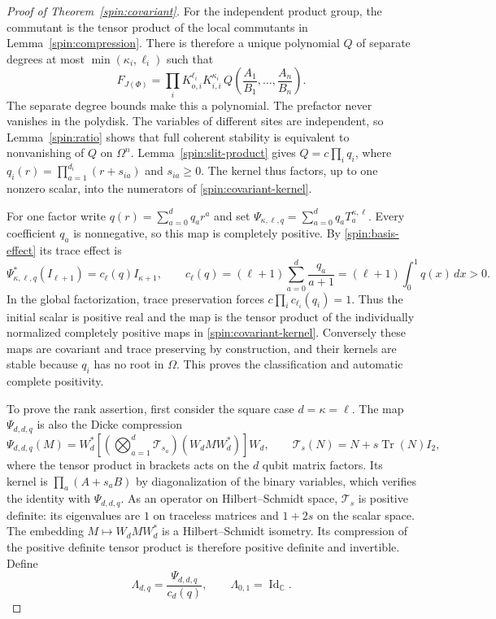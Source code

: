 \documentclass[reqno]{amsart}
\theoremstyle{definition}
\theoremstyle{remark}
\newcommand{\C}{\mathbb C}
\DeclareMathOperator{\Tr}{Tr}
\DeclareMathOperator{\Id}{Id}
\begin{document}
\begin{proof}[Proof of Theorem~\ref{spin:covariant}]
For the independent product group, the commutant is the tensor product
of the local commutants in Lemma~\ref{spin:compression}.  There is
therefore a unique polynomial $Q$ of separate degrees at most
$\min(\kappa_i,\ell_i)$ such that
\begin{equation}\label{spin:global-invariant}
 F_{J(\Phi)}=
 \prod_iK_{o,i}^{\ell_i}K_{i,i}^{\kappa_i}\,
 Q\left(\frac{A_1}{B_1},\ldots,\frac{A_n}{B_n}\right).
\end{equation}
The separate degree bounds make this a polynomial.  The prefactor
never vanishes in the polydisk.  The variables of different sites are
independent, so Lemma~\ref{spin:ratio} shows that full coherent stability
is equivalent to nonvanishing of $Q$ on $\Omega^n$.
Lemma~\ref{spin:slit-product} gives
$Q=c\prod_iq_i$, where
$q_i(r)=\prod_{a=1}^{d_i}(r+s_{ia})$ and $s_{ia}\geq0$.
The kernel thus factors, up to one nonzero scalar, into the numerators
of \eqref{spin:covariant-kernel}.

For one factor write $q(r)=\sum_{a=0}^dq_ar^a$ and set
$\Psi_{\kappa,\ell,q}=\sum_{a=0}^dq_aT_a^{\kappa,\ell}$.
Every coefficient $q_a$ is nonnegative, so this map is completely
positive.  By \eqref{spin:basis-effect} its trace effect is
\begin{equation}\label{spin:normalization}
 \Psi_{\kappa,\ell,q}^*(I_{\ell+1})
 =c_\ell(q)I_{\kappa+1},\qquad
 c_\ell(q)=(\ell+1)\sum_{a=0}^d\frac{q_a}{a+1}
          =(\ell+1)\int_0^1q(x)\,dx>0.
\end{equation}
In the global factorization, trace preservation forces
$c\prod_ic_{\ell_i}(q_i)=1$.  Thus the initial scalar is positive
real and the map is the tensor product of the individually normalized
completely positive maps in \eqref{spin:covariant-kernel}.
Conversely these maps are covariant and trace preserving by construction,
and their kernels are stable because $q_i$ has no root in $\Omega$.
This proves the classification and automatic complete positivity.

To prove the rank assertion, first consider the square case $d=\kappa
=\ell$.  The map $\Psi_{d,d,q}$ is also the Dicke compression
\begin{equation}\label{spin:core-compression}
 \Psi_{d,d,q}(M)=W_d^*\left[
     \left(\bigotimes_{a=1}^d\mathcal T_{s_a}\right)(W_dMW_d^*)\right]W_d,
 \qquad \mathcal T_s(N)=N+s\Tr(N)I_2,
\end{equation}
where the tensor product in brackets acts on the $d$ qubit matrix
factors.  Its kernel is $\prod_a(A+s_aB)$ by diagonalization of the
binary variables, which verifies the identity with $\Psi_{d,d,q}$.
As an operator on Hilbert--Schmidt space, $\mathcal T_s$ is positive
definite: its eigenvalues are $1$ on traceless matrices and $1+2s$ on
the scalar space.  The embedding $M\mapsto W_dMW_d^*$ is a
Hilbert--Schmidt isometry.  Its compression of the positive definite
tensor product is therefore positive definite and invertible.  Define
\begin{equation}\label{spin:core}
 \Lambda_{d,q}=\frac{\Psi_{d,d,q}}{c_d(q)},\qquad
 \Lambda_{0,1}=\Id_{\C}.
\end{equation}


\end{proof}
\end{document}
